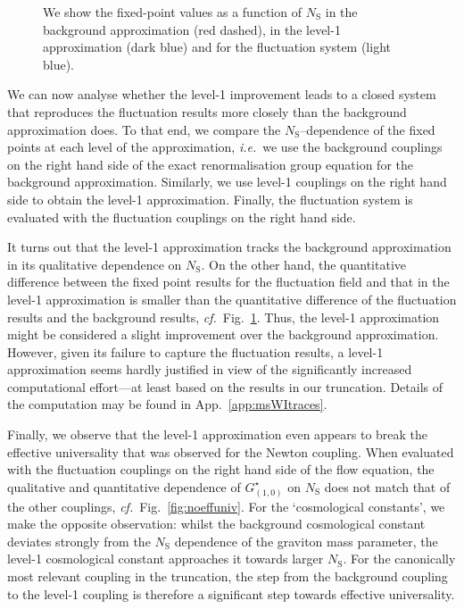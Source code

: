 \documentclass[11pt]{book}
\newcommand\NS{ N_{\scriptscriptstyle{\mathrm{S}}} }
\newcommand\ie{\textit{i.e.}\ }
\newcommand\cf{\textit{cf.}\ }
\numberwithin{equation}{chapter}
\begin{document}
\begin{figure}[p]
  \begin{center}
    
  \end{center}
  \caption{
    We show the fixed-point values as a function of $\NS$ in the background approximation (red dashed),
    in the level-1 approximation (dark blue) and for the fluctuation system (light blue).
  }
  \label{fig:level1comp}
\end{figure}

We can now analyse whether the level-1 improvement leads to a closed system
that reproduces the fluctuation results more closely than the background approximation does.
To that end, we compare the $\NS$--dependence of the fixed points at each level of the approximation,
\ie we use the background couplings on the right hand side of the exact renormalisation group
equation for the background approximation.
Similarly, we use level-1 couplings on the right hand side to obtain the level-1 approximation.
Finally, the fluctuation system is evaluated with the fluctuation couplings on the right hand side.

It turns out that the level-1 approximation tracks the background approximation in its qualitative
dependence on $\NS$.
On the other hand, the quantitative difference between the fixed point results for the
fluctuation field and that in the level-1 approximation is smaller than the quantitative difference of
the fluctuation results and the background results, \cf Fig.~\ref{fig:level1comp}.
Thus, the level-1 approximation might be considered a slight improvement over the background approximation.
However, given its failure to capture the fluctuation results, a level-1 approximation seems
hardly justified in view of the significantly increased computational effort---at least based on the
results in our truncation. Details of the computation may be found in App.~\ref{app:msWItraces}.

Finally, we observe that the level-1 approximation even appears to break the effective universality
that was observed for the Newton coupling.
When evaluated with the fluctuation couplings on the right hand side of the flow equation,
the qualitative and quantitative dependence of $G_{(1,0)}^{\star}$ on
$\NS$ does not match that of the other couplings, \cf Fig.~\ref{fig:noeffuniv}.
For the `cosmological constants', we make the opposite observation:
whilst the background cosmological constant deviates strongly from the $\NS$ dependence
of the graviton mass parameter,
the level-1 cosmological constant approaches it towards larger $\NS$.
For the canonically most relevant coupling in the truncation,
the step from the background coupling to the level-1 coupling is
therefore a significant step towards effective universality.
\end{document}
